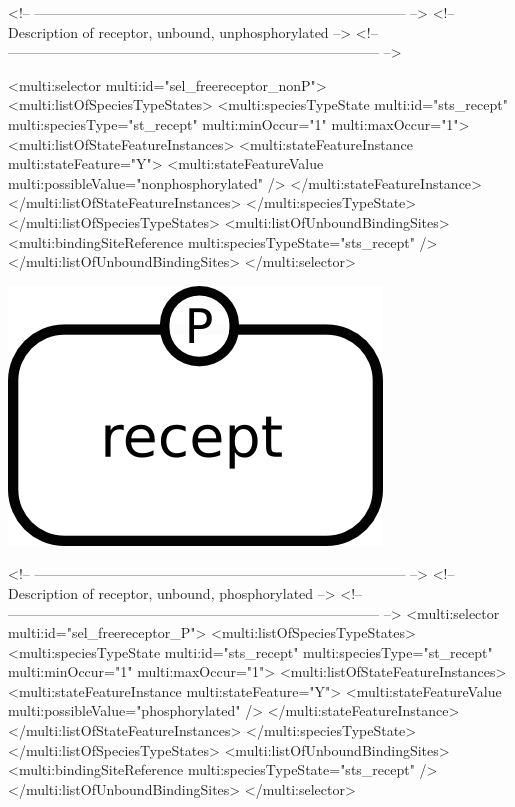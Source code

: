 \begin{example}
<!-- -------------------------------------------------------------------------------- -->
<!-- Description of receptor, unbound, unphosphorylated                               -->
<!-- -------------------------------------------------------------------------------- -->
    
      <multi:selector multi:id="sel_freereceptor_nonP">
        <multi:listOfSpeciesTypeStates>
          <multi:speciesTypeState multi:id="sts_recept" multi:speciesType="st_recept" 
                                   multi:minOccur="1" multi:maxOccur="1">
            <multi:listOfStateFeatureInstances>
              <multi:stateFeatureInstance multi:stateFeature="Y">
                <multi:stateFeatureValue multi:possibleValue="nonphosphorylated" />
              </multi:stateFeatureInstance>
            </multi:listOfStateFeatureInstances>
          </multi:speciesTypeState>
        </multi:listOfSpeciesTypeStates>
        <multi:listOfUnboundBindingSites>
          <multi:bindingSiteReference multi:speciesTypeState="sts_recept" />
        </multi:listOfUnboundBindingSites>
      </multi:selector>
\end{example}

\includegraphics{figs/pngs/sel_freereceptor_P.png}

\begin{example}
<!-- -------------------------------------------------------------------------------- -->
<!-- Description of receptor, unbound, phosphorylated                                 -->
<!-- -------------------------------------------------------------------------------- -->
      <multi:selector multi:id="sel_freereceptor_P">
        <multi:listOfSpeciesTypeStates>
          <multi:speciesTypeState multi:id="sts_recept" multi:speciesType="st_recept" 
                                   multi:minOccur="1" multi:maxOccur="1">
            <multi:listOfStateFeatureInstances>
              <multi:stateFeatureInstance multi:stateFeature="Y">
                <multi:stateFeatureValue multi:possibleValue="phosphorylated" />
              </multi:stateFeatureInstance>
            </multi:listOfStateFeatureInstances>
          </multi:speciesTypeState>
        </multi:listOfSpeciesTypeStates>
        <multi:listOfUnboundBindingSites>
          <multi:bindingSiteReference multi:speciesTypeState="sts_recept" />
        </multi:listOfUnboundBindingSites>
      </multi:selector>
\end{example}

